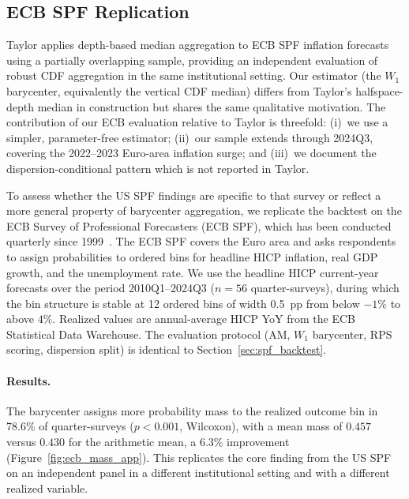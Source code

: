 \subsection*{ECB SPF Replication}

Taylor \cite{taylor26} applies depth-based median aggregation to ECB SPF inflation forecasts
using a partially overlapping sample, providing an independent evaluation of robust CDF
aggregation in the same institutional setting.  Our estimator (the $W_1$ barycenter,
equivalently the vertical CDF median) differs from Taylor's halfspace-depth median in
construction but shares the same qualitative motivation.  The contribution of our ECB
evaluation relative to Taylor \cite{taylor26} is threefold: (i)~we use a simpler,
parameter-free estimator; (ii)~our sample extends through 2024Q3, covering the 2022--2023
Euro-area inflation surge; and (iii)~we document the dispersion-conditional pattern which is
not reported in Taylor.

To assess whether the US SPF findings are specific to that survey or reflect a more general
property of barycenter aggregation, we replicate the backtest on the ECB Survey of Professional
Forecasters (ECB SPF), which has been conducted quarterly since 1999~\cite{garcia05}.  The ECB
SPF covers the Euro area and asks respondents to assign probabilities to ordered bins for
headline HICP inflation, real GDP growth, and the unemployment rate.  We use the headline HICP
current-year forecasts over the period 2010Q1--2024Q3 ($n=56$ quarter-surveys), during which
the bin structure is stable at 12 ordered bins of width 0.5~pp from below $-1\%$ to above
$4\%$.  Realized values are annual-average HICP YoY from the ECB Statistical Data Warehouse.
The evaluation protocol (AM, $W_1$ barycenter, RPS scoring, dispersion split) is identical to
Section~\ref{sec:spf_backtest}.

\paragraph{Results.}  The barycenter assigns more probability mass to the realized outcome bin
in 78.6\% of quarter-surveys ($p<0.001$, Wilcoxon), with a mean mass of $0.457$ versus
$0.430$ for the arithmetic mean, a 6.3\% improvement (Figure~\ref{fig:ecb_mass_app}).  This
replicates the core finding from the US SPF on an independent panel in a different
institutional setting and with a different realized variable.


